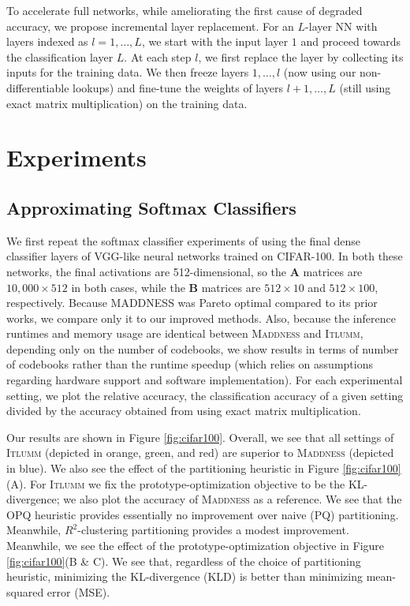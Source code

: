 \documentclass{article}
\begin{document}
To accelerate full networks, while ameliorating the first cause of degraded accuracy, we propose incremental layer replacement.
For an $L$-layer NN with layers indexed as $l = 1,\dots,L$, we start with the input layer $1$ and proceed towards the classification layer $L$.
At each step $l$, we first replace the layer by collecting its inputs for the training data.
We then freeze layers $1,\dots,l$ (now using our non-differentiable lookups) and fine-tune the weights of layers $l+1,\dots,L$ (still using exact matrix multiplication) on the training data.


\section{Experiments}

\subsection{Approximating Softmax Classifiers}

We first repeat the softmax classifier experiments of \cite{blalock2021a} using the final dense classifier layers of VGG-like neural networks trained on CIFAR-100.
In both these networks, the final activations are 512-dimensional, so the $\bm{A}$ matrices are $10{,}000 \times 512$ in both cases, while the $\bm{B}$ matrices are $512 \times 10$ and $512 \times 100$, respectively.
Because MADDNESS was Pareto optimal compared to its prior works, we compare only it to our improved methods. 
Also, because the inference runtimes and memory usage are identical between \textsc{Maddness} and \textsc{Itlumm}, depending only on the number of codebooks, we show results in terms of number of codebooks rather than the runtime speedup (which relies on assumptions regarding hardware support and software implementation).
For each experimental setting, we plot the relative accuracy, the classification accuracy of a given setting divided by the accuracy obtained from using exact matrix multiplication.

Our results are shown in Figure \ref{fig:cifar100}.
Overall, we see that all settings of \textsc{Itlumm} (depicted in orange, green, and red) are superior to \textsc{Maddness} (depicted in blue).
We also see the effect of the partitioning heuristic in Figure \ref{fig:cifar100}(A).
For \textsc{Itlumm} we fix the prototype-optimization objective to be the KL-divergence; we also plot the accuracy of \textsc{Maddness} as a reference.
We see that the OPQ heuristic provides essentially no improvement over naive (PQ) partitioning. Meanwhile, $R^2$-clustering partitioning provides a modest improvement.
Meanwhile, we see the effect of the prototype-optimization objective in Figure \ref{fig:cifar100}(B \& C).
We see that, regardless of the choice of partitioning heuristic, minimizing the KL-divergence (KLD) is better than minimizing mean-squared error (MSE).
\end{document}
